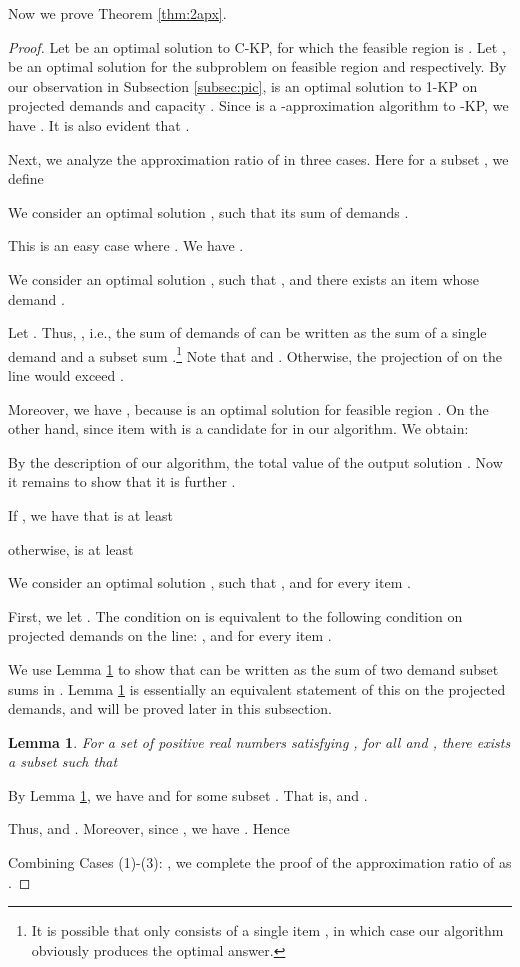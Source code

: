 \documentclass{aamas2013}
\newtheorem{lemma}[theorem]{Lemma}
\begin{document}
Now we prove Theorem \ref{thm:2apx}.
\begin{proof}
Let  be an optimal solution to C-KP, for which the feasible region is .  Let ,  be an optimal solution for the subproblem on feasible region  and  respectively.  By our observation in Subsection \ref{subsec:pic},  is an optimal solution to 1-KP on projected demands and capacity .  Since  is a -approximation algorithm to {-KP}, we have .  It is also evident that .

Next, we analyze the approximation ratio of  in three cases.  Here for a subset , we define 


 We consider an optimal solution , such that its sum of demands .  

This is an easy case where .  We have .
\vskip 5pt

 We consider an optimal solution , such that , and there exists an item  whose demand .  

Let . Thus, , i.e., the sum of demands of  can be written as the sum of a single demand  and a subset sum .\footnote{It is possible that  only consists of a single item , in which case our algorithm obviously produces the optimal answer.}  Note that  and . Otherwise, the projection of  on the  line would exceed .  

Moreover, we have , because  is an optimal solution for feasible region .  On the other hand,  since item  with  is a candidate for  in our algorithm.  
We obtain:


By the description of our algorithm, the total value of the output solution .  Now it remains to show that it is further .

If , we have that  is at least 

otherwise,  is at least  





 We consider an optimal solution , such that , and  for every item .

First, we let .  The condition on  is equivalent to the following condition on 
projected demands on the  line: , and  for every item .

We use Lemma \ref{lem:subsetsumA} to show that  can be written as the sum of two demand subset sums in .  Lemma \ref{lem:subsetsumA} is essentially an equivalent statement of this on the projected demands, and will be proved later in this subsection.     

\begin{lemma} \label{lem:subsetsumA}
For a set of  positive real numbers  satisfying ,   for all  and , there exists a subset  such that

\end{lemma}

By Lemma \ref{lem:subsetsumA}, we have  and  for some subset . That is,  and .

Thus,  and .  Moreover, since , we have .  Hence  



Combining Cases (1)-(3): , we complete the proof of the approximation ratio of  as .
\end{proof}
\end{document}
